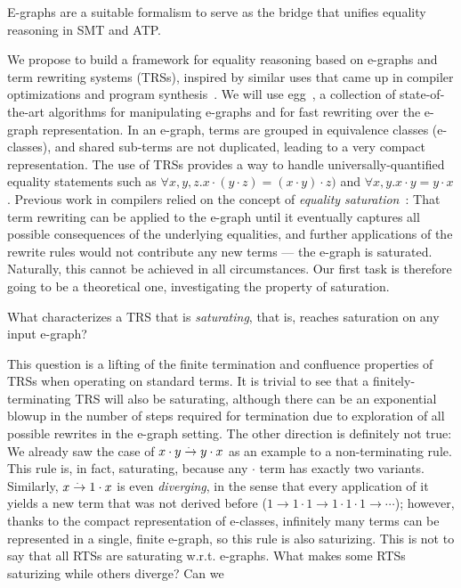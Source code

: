 \begin{proposal}E-graphs are a suitable formalism to serve as the bridge that unifies equality reasoning in SMT and ATP.
\end{proposal}

We propose to build a framework for equality reasoning based on e-graphs and term rewriting systems (TRSs), 
inspired by similar uses that came up in compiler optimizations and program synthesis~\cite{everything-zack}.
We will use egg~\cite{egg}, a collection of state-of-the-art algorithms for manipulating e-graphs and for fast rewriting over the e-graph representation.
In an e-graph, terms are grouped in equivalence classes (e-classes), and shared sub-terms are not duplicated, leading to a very compact representation.
The use of TRSs provides a way to handle universally-quantified equality statements such as $\forall x,y,z. x\cdot(y\cdot z) = (x\cdot y)\cdot z)$ and $\forall x,y. x\cdot y = y \cdot x$.
Previous work in compilers relied on the concept of \emph{equality saturation}~\cite{equsat}:
That term rewriting can be applied to the e-graph until it eventually captures all possible consequences of the underlying equalities, and further applications of the rewrite rules would not contribute any new terms ---
the e-graph is saturated.
Naturally, this cannot be achieved in all circumstances.
Our first task is therefore going to be a theoretical one, investigating the property of saturation.

\begin{researchquestion}What characterizes a TRS that is \emph{saturating}, that is, reaches saturation on any input e-graph?
\end{researchquestion}
 
This question is a lifting of the finite termination and confluence properties of TRSs when operating on standard terms.
It is trivial to see that a finitely-terminating TRS will also be saturating,
although there can be an exponential blowup in the number of steps required for termination due to exploration of all possible rewrites in the e-graph setting.
The other direction is definitely not true:
We already saw the case of $x \cdot y \overset{.~}{\to} y\cdot x$ as an example to a non-terminating rule.
This rule is, in fact, saturating, because any $\cdot$ term has exactly two variants.
Similarly, $x \overset{.~}{\to} 1\cdot x$ is even \emph{diverging}, in the sense that every application of it yields a new term that was not derived before ($1 \to 1\cdot 1 \to 1\cdot 1 \cdot 1 \to \cdots$);
however, thanks to the compact representation of e-classes, infinitely many terms can be represented in a single, finite e-graph, so this rule is also saturizing.
This is not to say that all RTSs are saturating w.r.t. e-graphs.
What makes some RTSs saturizing while others diverge?
Can we 
